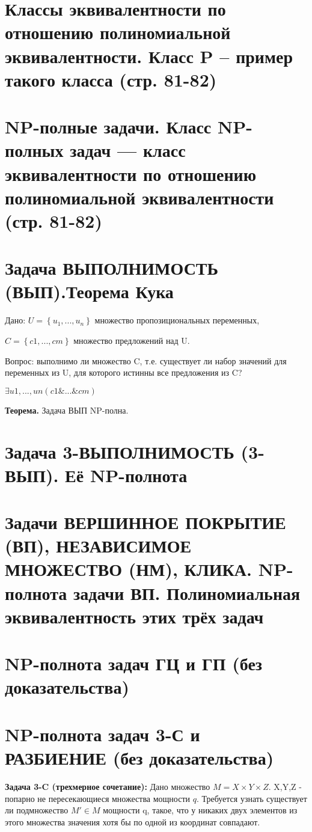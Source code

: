\documentclass[40pt]{article}
\begin{document}
\section{Классы эквивалентности по отношению полиномиальной эквивалентности. Класс P – пример такого класса (стр. 81-82)}
\section{NP-полные задачи. Класс NP-полных задач — класс эквивалентности по отношению полиномиальной эквивалентности (стр. 81-82)}
\section{Задача ВЫПОЛНИМОСТЬ (ВЫП).Теорема Кука}

Дано: $U = \left\{u_1, ..., u_n\right\}$ множество пропозициональных переменных,

$C = \left\{c1, ..., cm\right\}$ множество предложений над U.

Вопрос: выполнимо ли множество C, т.е. существует ли набор значений
для переменных из U, для которого истинны все предложения из C?

$\exists u1, ..., un(c1 \& ... \& cm)$

\textbf{Теорема.} Задача ВЫП NP-полна.


\section{Задача 3-ВЫПОЛНИМОСТЬ (3-ВЫП). Её NP-полнота}
\section{Задачи ВЕРШИННОЕ ПОКРЫТИЕ (ВП), НЕЗАВИСИМОЕ МНОЖЕСТВО (НМ), КЛИКА.  NP-полнота задачи ВП.  Полиномиальная эквивалентность этих трёх задач}
\section{NP-полнота задач ГЦ и ГП (без доказательства)}
\section{NP-полнота задач 3-С и РАЗБИЕНИЕ (без доказательства)}

\par \textbf{Задача 3-C (трехмерное сочетание):} Дано множество $M = X \times Y \times Z$. X,Y,Z - попарно не пересекающиеся множества мощности $q$. Требуется узнать существует ли подмножество $M' \in M$ мощности q, такое, что у никаких двух элементов из этого множества значения хотя бы по одной из координат совпадают.
 
\end{document}
